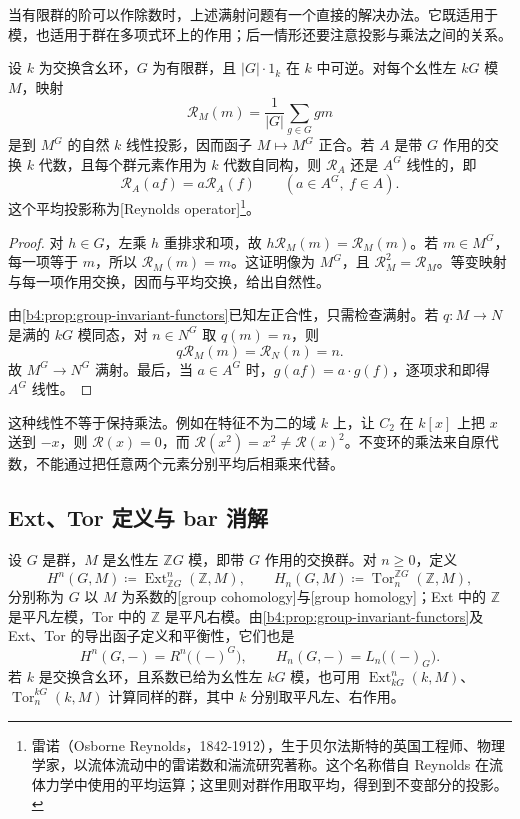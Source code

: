 \ProseParagraphBreak
当有限群的阶可以作除数时，上述满射问题有一个直接的解决办法。它既适用于模，也适用于群在多项式环上的作用；后一情形还要注意投影与乘法之间的关系。

\begin{proposition}\label{b4:prop:reynolds-exactness}
	设 \(k\) 为交换含幺环，\(G\) 为有限群，且 \(|G|\cdot1_k\) 在 \(k\) 中可逆。对每个幺性左 \(kG\) 模 \(M\)，映射
	\[
		\mathcal R_M(m)=\frac1{|G|}\sum_{g\in G}gm
	\]
	是到 \(M^G\) 的自然 \(k\) 线性投影，因而函子 \(M\mapsto M^G\) 正合。若 \(A\) 是带 \(G\) 作用的交换 \(k\) 代数，且每个群元素作用为 \(k\) 代数自同构，则 \(\mathcal R_A\) 还是 \(A^G\) 线性的，即
	\[
		\mathcal R_A(af)=a\mathcal R_A(f) \qquad(a\in A^G,\ f\in A).
	\]
	这个平均投影称为[Reynolds operator]\footnote{雷诺（Osborne Reynolds，1842-1912），生于贝尔法斯特的英国工程师、物理学家，以流体流动中的雷诺数和湍流研究著称。这个名称借自 Reynolds 在流体力学中使用的平均运算；这里则对群作用取平均，得到到不变部分的投影。}。
\end{proposition}
\begin{proof}
	对 \(h\in G\)，左乘 \(h\) 重排求和项，故 \(h\mathcal R_M(m)=\mathcal R_M(m)\)。若 \(m\in M^G\)，每一项等于 \(m\)，所以 \(\mathcal R_M(m)=m\)。这证明像为 \(M^G\)，且 \(\mathcal R_M^2=\mathcal R_M\)。等变映射与每一项作用交换，因而与平均交换，给出自然性。

	由\cref{b4:prop:group-invariant-functors}已知左正合性，只需检查满射。若 \(q:M\to N\) 是满的 \(kG\) 模同态，对 \(n\in N^G\) 取 \(q(m)=n\)，则
	\[
		q\mathcal R_M(m)=\mathcal R_N(n)=n.
	\]
	故 \(M^G\to N^G\) 满射。最后，当 \(a\in A^G\) 时，\(g(af)=a\cdot g(f)\)，逐项求和即得 \(A^G\) 线性。
\end{proof}

这种线性不等于保持乘法。例如在特征不为二的域 \(k\) 上，让 \(C_2\) 在 \(k[x]\) 上把 \(x\) 送到 \(-x\)，则 \(\mathcal R(x)=0\)，而 \(\mathcal R(x^2)=x^2\ne\mathcal R(x)^2\)。不变环的乘法来自原代数，不能通过把任意两个元素分别平均后相乘来代替。

\subsection{Ext、Tor 定义与 bar 消解}
\label{b4:subsec:1101:02}

\begin{definition}\label{b4:def:group-cohomology}
	设 \(G\) 是群，\(M\) 是幺性左 \(\mathbb ZG\) 模，即带 \(G\) 作用的交换群。对 \(n\ge0\)，定义
	\[
		H^n(G,M)\coloneqq\operatorname{Ext}_{\mathbb ZG}^n(\mathbb Z,M), \qquad H_n(G,M)\coloneqq\operatorname{Tor}^{\mathbb ZG}_n(\mathbb Z,M),
	\]
	分别称为 \(G\) 以 \(M\) 为系数的[group cohomology]与[group homology]；Ext 中的 \(\mathbb Z\) 是平凡左模，Tor 中的 \(\mathbb Z\) 是平凡右模。由\cref{b4:prop:group-invariant-functors}及 Ext、Tor 的导出函子定义和平衡性，它们也是
	\[
		H^n(G,-)=R^n\bigl((-)^G\bigr), \qquad H_n(G,-)=L_n\bigl((-)_{G}\bigr).
	\]
	若 \(k\) 是交换含幺环，且系数已给为幺性左 \(kG\) 模，也可用 \(\operatorname{Ext}_{kG}^n(k,M)\)、\(\operatorname{Tor}^{kG}_n(k,M)\) 计算同样的群，其中 \(k\) 分别取平凡左、右作用。
\end{definition}

